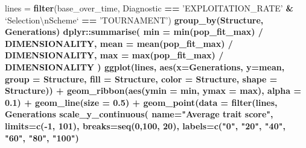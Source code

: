 \documentclass[]{book}
\newenvironment{Shaded}{\begin{snugshade}}{\end{snugshade}}
\newcommand{\CharTok}[1]{\textcolor[rgb]{0.31,0.60,0.02}{#1}}
\newcommand{\DataTypeTok}[1]{\textcolor[rgb]{0.13,0.29,0.53}{#1}}
\newcommand{\DecValTok}[1]{\textcolor[rgb]{0.00,0.00,0.81}{#1}}
\newcommand{\FloatTok}[1]{\textcolor[rgb]{0.00,0.00,0.81}{#1}}
\newcommand{\KeywordTok}[1]{\textcolor[rgb]{0.13,0.29,0.53}{\textbf{#1}}}
\newcommand{\NormalTok}[1]{#1}
\newcommand{\OperatorTok}[1]{\textcolor[rgb]{0.81,0.36,0.00}{\textbf{#1}}}
\newcommand{\StringTok}[1]{\textcolor[rgb]{0.31,0.60,0.02}{#1}}
\begin{document}
\begin{Shaded}
\begin{Highlighting}[]
\NormalTok{lines =}\StringTok{ }\KeywordTok{filter}\NormalTok{(base_over_time, Diagnostic }\OperatorTok{==}\StringTok{ 'EXPLOITATION_RATE'} \OperatorTok{&}\StringTok{ `}\DataTypeTok{Selection}\CharTok{\textbackslash{}n}\DataTypeTok{Scheme}\StringTok{`} \OperatorTok{==}\StringTok{ 'TOURNAMENT'}\NormalTok{) }\OperatorTok{%>%}
\StringTok{  }\KeywordTok{group_by}\NormalTok{(Structure, Generations) }\OperatorTok{%>%}
\StringTok{  }\NormalTok{dplyr}\OperatorTok{::}\KeywordTok{summarise}\NormalTok{(}
    \DataTypeTok{min =} \KeywordTok{min}\NormalTok{(pop_fit_max) }\OperatorTok{/}\StringTok{ }\NormalTok{DIMENSIONALITY,}
    \DataTypeTok{mean =} \KeywordTok{mean}\NormalTok{(pop_fit_max) }\OperatorTok{/}\StringTok{ }\NormalTok{DIMENSIONALITY,}
    \DataTypeTok{max =} \KeywordTok{max}\NormalTok{(pop_fit_max) }\OperatorTok{/}\StringTok{ }\NormalTok{DIMENSIONALITY}
\NormalTok{  )}
\KeywordTok{ggplot}\NormalTok{(lines, }\KeywordTok{aes}\NormalTok{(}\DataTypeTok{x=}\NormalTok{Generations, }\DataTypeTok{y=}\NormalTok{mean, }\DataTypeTok{group =}\NormalTok{ Structure, }\DataTypeTok{fill =}\NormalTok{ Structure, }\DataTypeTok{color =}\NormalTok{ Structure, }\DataTypeTok{shape =}\NormalTok{ Structure)) }\OperatorTok{+}
\StringTok{  }\KeywordTok{geom_ribbon}\NormalTok{(}\KeywordTok{aes}\NormalTok{(}\DataTypeTok{ymin =}\NormalTok{ min, }\DataTypeTok{ymax =}\NormalTok{ max), }\DataTypeTok{alpha =} \FloatTok{0.1}\NormalTok{) }\OperatorTok{+}
\StringTok{  }\KeywordTok{geom_line}\NormalTok{(}\DataTypeTok{size =} \FloatTok{0.5}\NormalTok{) }\OperatorTok{+}
\StringTok{  }\KeywordTok{geom_point}\NormalTok{(}\DataTypeTok{data =} \KeywordTok{filter}\NormalTok{(lines, Generations }\OperatorTok{%%}\StringTok{ }\DecValTok{2000} \OperatorTok{==}\StringTok{ }\DecValTok{0}\NormalTok{), }\DataTypeTok{size =} \FloatTok{2.5}\NormalTok{, }\DataTypeTok{stroke =} \FloatTok{2.0}\NormalTok{, }\DataTypeTok{alpha =} \FloatTok{1.0}\NormalTok{) }\OperatorTok{+}
\StringTok{  }\KeywordTok{scale_y_continuous}\NormalTok{(}
    \DataTypeTok{name=}\StringTok{"Average trait score"}\NormalTok{,}
    \DataTypeTok{limits=}\KeywordTok{c}\NormalTok{(}\OperatorTok{-}\DecValTok{1}\NormalTok{, }\DecValTok{101}\NormalTok{),}
    \DataTypeTok{breaks=}\KeywordTok{seq}\NormalTok{(}\DecValTok{0}\NormalTok{,}\DecValTok{100}\NormalTok{, }\DecValTok{20}\NormalTok{),}
    \DataTypeTok{labels=}\KeywordTok{c}\NormalTok{(}\StringTok{"0"}\NormalTok{, }\StringTok{"20"}\NormalTok{, }\StringTok{"40"}\NormalTok{, }\StringTok{"60"}\NormalTok{, }\StringTok{"80"}\NormalTok{, }\StringTok{"100"}\NormalTok{)}
}}}
\end{Highlighting}
\end{Shaded}
\end{document}
